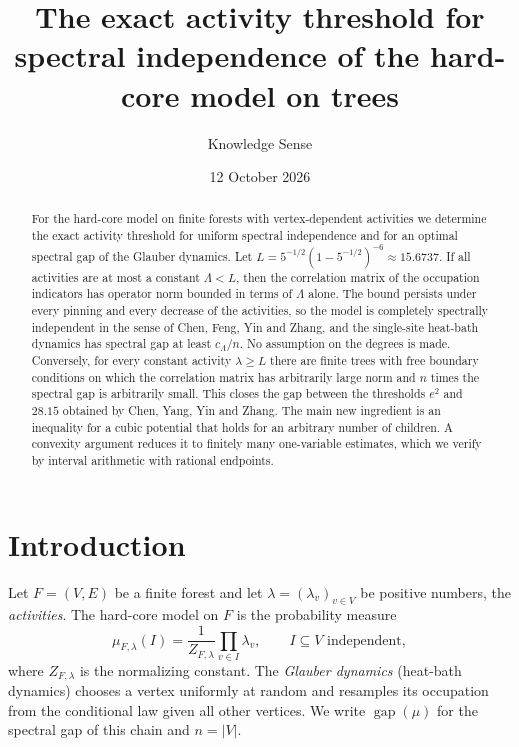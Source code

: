 \documentclass{amsart}
\numberwithin{equation}{section}
\numberwithin{table}{section}
\theoremstyle{definition}
\theoremstyle{remark}
\newcommand{\gap}{\operatorname{gap}}
\begin{document}
\title[Exact threshold for the hard-core model on trees]{The exact activity threshold for spectral independence of the hard-core model on trees}

\author{Knowledge Sense}
\address{Knowledge Sense}

\date{12 October 2026}



\begin{abstract}
For the hard-core model on finite forests with vertex-dependent activities we determine the exact activity threshold for uniform spectral independence and for an optimal spectral gap of the Glauber dynamics. Let $L=5^{-1/2}(1-5^{-1/2})^{-6}\approx 15.6737$. If all activities are at most a constant $\Lambda<L$, then the correlation matrix of the occupation indicators has operator norm bounded in terms of $\Lambda$ alone. The bound persists under every pinning and every decrease of the activities, so the model is completely spectrally independent in the sense of Chen, Feng, Yin and Zhang, and the single-site heat-bath dynamics has spectral gap at least $c_\Lambda/n$. No assumption on the degrees is made. Conversely, for every constant activity $\lambda\ge L$ there are finite trees with free boundary conditions on which the correlation matrix has arbitrarily large norm and $n$ times the spectral gap is arbitrarily small. This closes the gap between the thresholds $e^2$ and $28.15$ obtained by Chen, Yang, Yin and Zhang. The main new ingredient is an inequality for a cubic potential that holds for an arbitrary number of children. A convexity argument reduces it to finitely many one-variable estimates, which we verify by interval arithmetic with rational endpoints.
\end{abstract}

\maketitle

\section{Introduction}

Let $F=(V,E)$ be a finite forest and let $\lambda=(\lambda_v)_{v\in V}$ be positive numbers, the \emph{activities}. The hard-core model on $F$ is the probability measure
\begin{equation}\label{eq:hardcore}
\mu_{F,\lambda}(I)=\frac{1}{Z_{F,\lambda}}\prod_{v\in I}\lambda_v,\qquad I\subseteq V \text{ independent},
\end{equation}
where $Z_{F,\lambda}$ is the normalizing constant. The \emph{Glauber dynamics} (heat-bath dynamics) chooses a vertex uniformly at random and resamples its occupation from the conditional law given all other vertices. We write $\gap(\mu)$ for the spectral gap of this chain and $n=|V|$.
\end{document}
